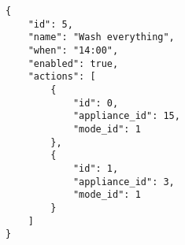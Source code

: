 \begin{lstlisting}[language=numbered,caption={[Example of a routine with two actions]Example of a routine with two actions.},label=code:routine_wash_everything,float,floatplacement=H]
{
    "id": 5,
    "name": "Wash everything",
    "when": "14:00",
    "enabled": true,
    "actions": [
        {
            "id": 0,
            "appliance_id": 15,
            "mode_id": 1
        },
        {
            "id": 1,
            "appliance_id": 3,
            "mode_id": 1
        }
    ]
}
\end{lstlisting}
